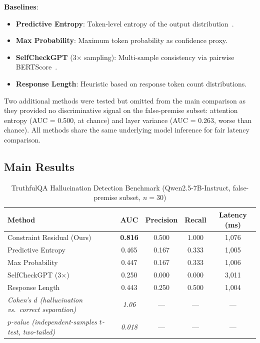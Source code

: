 \documentclass[11pt]{article}
\begin{document}
\textbf{Baselines}:
\begin{itemize}
  \item \textbf{Predictive Entropy}: Token-level entropy of the output distribution~\cite{kadavath2022language}.
  \item \textbf{Max Probability}: Maximum token probability as confidence proxy.
  \item \textbf{SelfCheckGPT} (3$\times$ sampling): Multi-sample consistency via pairwise BERTScore~\cite{manakul2023selfcheckgpt}.
  \item \textbf{Response Length}: Heuristic based on response token count distributions.
\end{itemize}

Two additional methods were tested but omitted from the main comparison as they provided no discriminative signal on the false-premise subset: attention entropy (AUC = 0.500, at chance) and layer variance (AUC = 0.263, worse than chance). All methods share the same underlying model inference for fair latency comparison.

\subsection{Main Results}

\begin{table}[h]
\centering
\caption{TruthfulQA Hallucination Detection Benchmark (Qwen2.5-7B-Instruct, false-premise subset, $n = 30$)}
\label{tab:benchmark}
\begin{tabular}{lcccc}
\toprule
\textbf{Method} & \textbf{AUC} & \textbf{Precision} & \textbf{Recall} & \textbf{Latency (ms)} \\
\midrule
Constraint Residual (Ours) & \textbf{0.816} & 0.500 & 1.000 & 1,076 \\
Predictive Entropy & 0.465 & 0.167 & 0.333 & 1,005 \\
Max Probability & 0.447 & 0.167 & 0.333 & 1,006 \\
SelfCheckGPT (3$\times$) & 0.250 & 0.000 & 0.000 & 3,011 \\
Response Length & 0.443 & 0.250 & 0.500 & 1,004 \\
\midrule
\textit{Cohen's $d$ (hallucination vs.\ correct separation)} & \textit{1.06} & --- & --- & --- \\
\textit{$p$-value (independent-samples $t$-test, two-tailed)} & \textit{0.018} & --- & --- & --- \\
\bottomrule
\end{tabular}
\end{table}
\end{document}
